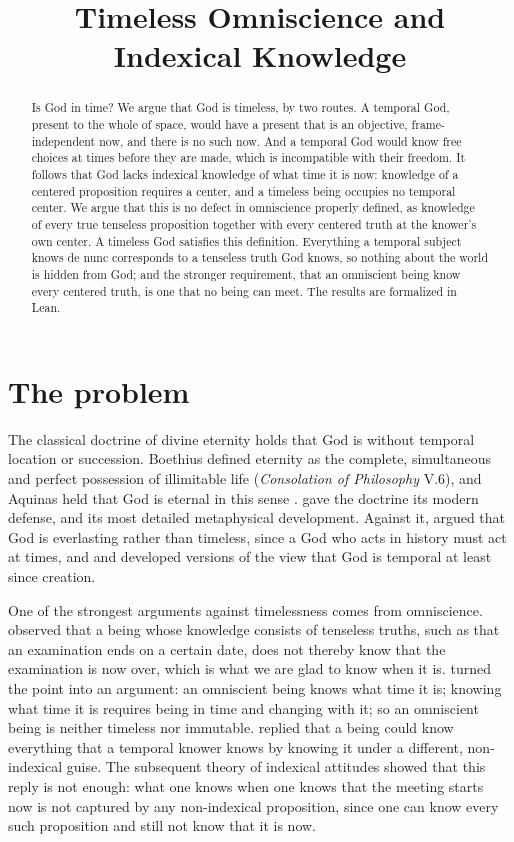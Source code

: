 \documentclass{situationist-preprint}
\title{Timeless Omniscience and Indexical Knowledge}
\begin{document}
\maketitle

\begin{abstract}
Is God in time? We argue that God is timeless, by two routes. A temporal God, present to the whole of space, would have a present that is an objective, frame-independent now, and there is no such now. And a temporal God would know free choices at times before they are made, which is incompatible with their freedom. It follows that God lacks indexical knowledge of what time it is now: knowledge of a centered proposition requires a center, and a timeless being occupies no temporal center. We argue that this is no defect in omniscience properly defined, as knowledge of every true tenseless proposition together with every centered truth at the knower's own center. A timeless God satisfies this definition. Everything a temporal subject knows de nunc corresponds to a tenseless truth God knows, so nothing about the world is hidden from God; and the stronger requirement, that an omniscient being know every centered truth, is one that no being can meet. The results are formalized in Lean.
\end{abstract}

\section{The problem}

The classical doctrine of divine eternity holds that God is without temporal location or succession. Boethius defined eternity as the complete, simultaneous and perfect possession of illimitable life (\emph{Consolation of Philosophy} V.6), and Aquinas held that God is eternal in this sense \citep[I, q.~10]{Aquinas}. \citet{StumpKretzmann1981} gave the doctrine its modern defense, and \citet{Leftow1991} its most detailed metaphysical development. Against it, \citet{Wolterstorff1975} argued that God is everlasting rather than timeless, since a God who acts in history must act at times, and \citet{Padgett1992} and \citet{Craig2001} developed versions of the view that God is temporal at least since creation.

One of the strongest arguments against timelessness comes from omniscience. \citet{Prior1962} observed that a being whose knowledge consists of tenseless truths, such as that an examination ends on a certain date, does not thereby know that the examination is now over, which is what we are glad to know when it is. \citet{Kretzmann1966} turned the point into an argument: an omniscient being knows what time it is; knowing what time it is requires being in time and changing with it; so an omniscient being is neither timeless nor immutable. \citet{Castaneda1967} replied that a being could know everything that a temporal knower knows by knowing it under a different, non-indexical guise. The subsequent theory of indexical attitudes \citep{Perry1979,Lewis1979} showed that this reply is not enough: what one knows when one knows that the meeting starts now is not captured by any non-indexical proposition, since one can know every such proposition and still not know that it is now.
\end{document}
